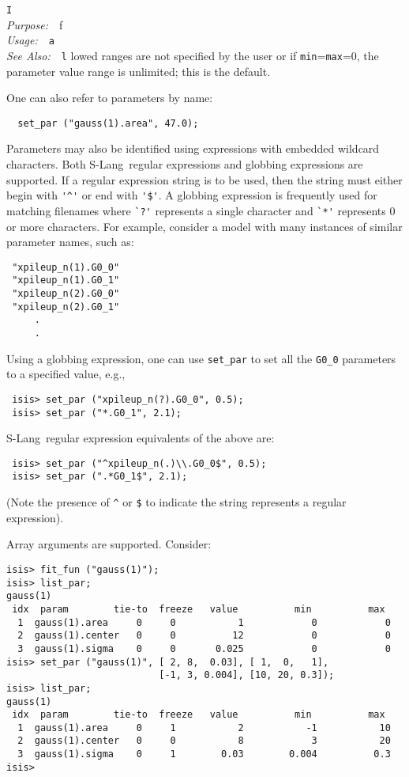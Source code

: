 \documentclass{book}
\makeatletter
\newif\ifpdf
\newcommand{\slang}{{\sc S-Lang}}
\newenvironment{isisfunction}[4]%
{\index{{#1}@{\tt #1}}%
  \ifpdf
  \else
     \addcontentsline{toc}{subsection}{{#1} -- {#2}}
  \fi
  \vbox{
          \vspace*{\baselineskip}
          {\LARGE\tt #1}\vspace*{\baselineskip}\\
          {{\it Purpose:}~~{#2}}\\
          {{\it Usage:}~~{\tt #3}}\\
          {{\it See Also:}~~{\tt #4}}
       }
}%
{ }
\makeatother
\begin{document}
{\begin{isisfunction}
If allowed ranges are not specified by the user or if
{\tt min}={\tt max}=0, the parameter value range is unlimited;
this is the default.

One can also refer to parameters by name:
\begin{verbatim}
  set_par ("gauss(1).area", 47.0);
\end{verbatim}

Parameters may also be identified using expressions with
embedded wildcard characters.  Both \slang\ regular expressions and
globbing expressions are supported.  If a regular expression
string is to be used, then the string must either begin with
\verb|'^'| or end with \verb|'$'|.  %
A globbing expression is frequently used for
matching filenames where \verb|`?'| represents a single
character and \verb|`*'| represents 0 or more characters.  For
example, consider a model with many instances of similar
parameter names, such as:
\begin{verbatim}
 "xpileup_n(1).G0_0"
 "xpileup_n(1).G0_1"
 "xpileup_n(2).G0_0"
 "xpileup_n(2).G0_1"
     .
     .
\end{verbatim}
Using a globbing expression, one can use \verb|set_par| to set all
the \verb|G0_0| parameters to a specified value, e.g.,
\begin{verbatim}
 isis> set_par ("xpileup_n(?).G0_0", 0.5);
 isis> set_par ("*.G0_1", 2.1);
\end{verbatim}

\slang\ regular expression equivalents of the above are:
\begin{verbatim}
 isis> set_par ("^xpileup_n(.)\\.G0_0$", 0.5);
 isis> set_par (".*G0_1$", 2.1);
\end{verbatim}
(Note the presence of \verb|^| or \verb|$| %
to indicate the string represents a regular expression).

Array arguments are supported.  Consider:
\begin{verbatim}
isis> fit_fun ("gauss(1)");
isis> list_par;
gauss(1)
 idx  param        tie-to  freeze   value          min          max
  1  gauss(1).area     0     0           1            0            0
  2  gauss(1).center   0     0          12            0            0
  3  gauss(1).sigma    0     0       0.025            0            0
isis> set_par ("gauss(1)", [ 2, 8,  0.03], [ 1,  0,   1],
                           [-1, 3, 0.004], [10, 20, 0.3]);
isis> list_par;
gauss(1)
 idx  param        tie-to  freeze   value          min          max
  1  gauss(1).area     0     1           2           -1           10
  2  gauss(1).center   0     0           8            3           20
  3  gauss(1).sigma    0     1        0.03        0.004          0.3
isis>
\end{verbatim}


\end{isisfunction}}
\end{document}
